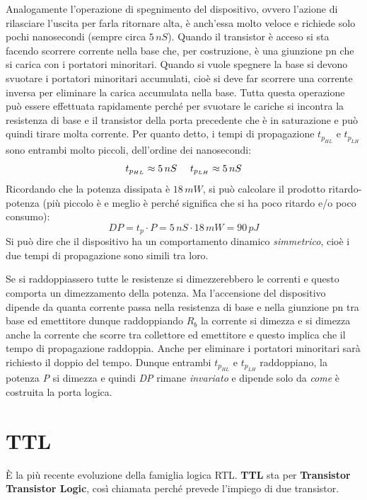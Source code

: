 \documentclass[12pt, a4paper]{report}
\begin{document}
Analogamente l'operazione di spegnimento del dispositivo, ovvero l'azione di rilasciare l'uscita per farla ritornare alta, è anch'essa molto veloce e richiede solo pochi nanosecondi (sempre circa $5\,nS$). Quando il transistor è acceso si sta facendo scorrere corrente nella base che, per costruzione, è una giunzione pn che si carica con i portatori minoritari. Quando si vuole spegnere la base si devono svuotare i portatori minoritari accumulati, cioè si deve far scorrere una corrente inversa per eliminare la carica accumulata nella base. Tutta questa operazione può essere effettuata rapidamente perché per svuotare le cariche si incontra la resistenza di base e il transistor della porta precedente che è in saturazione e può quindi tirare molta corrente. Per quanto detto, i tempi di propagazione $t_{p_{HL}}$ e $t_{p_{LH}}$ sono entrambi molto piccoli, dell'ordine dei nanosecondi:
\begin{equation}
    t_{p_{HL}} \approx 5\,nS \text{ \, \, } t_{p_{LH}} \approx 5\,nS
\end{equation}
Ricordando che la potenza dissipata è $18\,mW$, si può calcolare il prodotto ritardo-potenza (più piccolo è e meglio è perché significa che si ha poco ritardo e/o poco consumo):
\begin{equation}
    \textit{DP} = t_{p} \cdot P = 5\,nS \cdot 18\,mW = 90\,pJ
\end{equation}
Si può dire che il dispositivo ha un comportamento dinamico \textit{simmetrico}, cioè i due tempi di propagazione sono simili tra loro.

Se si raddoppiassero tutte le resistenze si dimezzerebbero le correnti e questo comporta un dimezzamento della potenza. Ma l'accensione del dispositivo dipende da quanta corrente passa nella resistenza di base e nella giunzione pn tra base ed emettitore dunque raddoppiando $R_b$ la corrente si dimezza e si dimezza anche la corrente che scorre tra collettore ed emettitore e questo implica che il tempo di propagazione raddoppia. Anche per eliminare i portatori minoritari sarà richiesto il doppio del tempo. Dunque entrambi $t_{p_{HL}}$ e $t_{p_{LH}}$ raddoppiano, la potenza \textit{P} si dimezza e quindi \textit{DP} rimane \textit{invariato} e dipende solo da \textit{come} è costruita la porta logica.

\chapter{TTL}
È la più recente evoluzione della famiglia logica RTL. \textbf{TTL} sta per \textbf{Transistor Transistor Logic}, così chiamata perché prevede l'impiego di due transistor.
\end{document}
